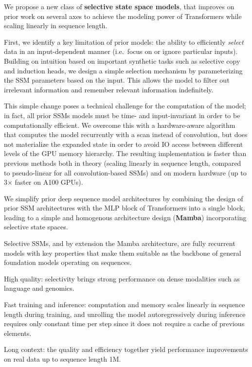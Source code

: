 %

%

We propose a new class of \textbf{selective state space models},
that improves on prior work on several axes to achieve the modeling power of Transformers while scaling linearly in sequence length.
%

First, we identify a key limitation of prior models: the ability to efficiently \emph{select} data in an input-dependent manner (i.e.\ focus on or ignore particular inputs).
Building on intuition based on important synthetic tasks such as selective copy and induction heads, we design a simple selection mechanism by parameterizing the SSM parameters based on the input.
This allows the model to filter out irrelevant information and remember relevant information indefinitely.

 This simple change poses a technical challenge for the computation of the model; in fact, all prior SSMs models must be time- and input-invariant in order to be computationally efficient.
We overcome this with a hardware-aware algorithm that computes the model recurrently with a scan instead of convolution, but does not materialize the expanded state in order to avoid IO access between different levels of the GPU memory hierarchy.
The resulting implementation is faster than previous methods both in theory (scaling linearly in sequence length, compared to pseudo-linear for all convolution-based SSMs) and on modern hardware (up to 3$\times$ faster on A100 GPUs).

We simplify prior deep sequence model architectures by combining the design of prior SSM architectures \citep{dao2023hungry} with the MLP block of Transformers into a single block, leading to a simple and homogenous architecture design (\textbf{Mamba}) incorporating selective state spaces.



%

Selective SSMs, and by extension the Mamba architecture, are fully recurrent models with key properties that make them suitable as the backbone of general foundation models operating on sequences.
\begin{enumerate*}[label=(\roman*)]
\item High quality: selectivity brings strong performance on dense modalities such as language and genomics.
\item Fast training and inference: computation and memory scales linearly in sequence length during training, and unrolling the model autoregressively during inference requires only constant time per step since it does not require a cache of previous elements.
\item Long context: the quality and efficiency together yield performance improvements on real data up to sequence length 1M.
\end{enumerate*}

